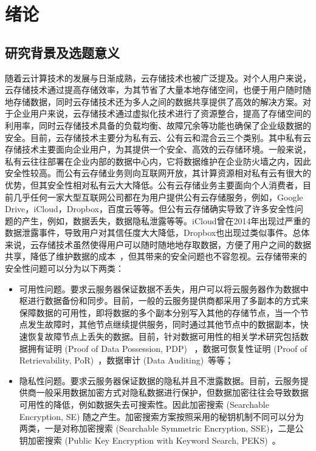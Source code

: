 \chapter{绪论}
\label{cha:intro}
\section{研究背景及选题意义}
随着云计算技术的发展与日渐成熟，云存储技术也被广泛提及。对个人用户来说，云存储技术通过提高存储效率，为其节省了大量本地存储空间，也便于用户随时随地存储数据，同时云存储技术还为多人之间的数据共享提供了高效的解决方案。对于企业用户来说，云存储技术通过虚拟化技术进行了资源整合，提高了存储空间的利用率，同时云存储技术具备的负载均衡、故障冗余等功能也确保了企业级数据的安全。目前，云存储技术主要分为私有云、公有云和混合云三个类别。其中私有云存储技术主要面向企业用户，为其提供一个安全、高效的云存储环境。一般来说，私有云往往部署在企业内部的数据中心内，它将数据维护在企业防火墙之内，因此安全性较高。而公有云存储业务则向互联网开放，其计算资源相对私有云有很大的优势，但其安全性相对私有云大大降低。公有云存储业务主要面向个人消费者，目前几乎任何一家大型互联网公司都在为用户提供公有云存储服务，例如，Google Drive，iCloud，Dropbox，百度云等等。但公有云存储确实导致了许多安全性问题的产生，例如，数据丢失，数据隐私泄露等等。iCloud曾在2014年出现过严重的数据泄露事件，导致用户对其信任度大大降低，Dropbox也出现过类似事件。总体来说，云存储技术虽然使得用户可以随时随地地存取数据，方便了用户之间的数据共享，降低了维护数据的成本~\cite{juels2007pors,ateniese2008scalable,kamara2011cs2,wang2011enabling,stefanov2012iris,kamara2013parallel,sun2015catch}，但其带来的安全问题也不容忽视。云存储带来的安全性问题可以分为以下两类：
\begin{itemize}
	\item 可用性问题。要求云服务器保证数据不丢失，用户可以将云服务器作为数据中枢进行数据备份和同步。目前，一般的云服务提供商都采用了多副本的方式来保障数据的可用性，即将数据的多个副本分别写入其他的存储节点，当一个节点发生故障时，其他节点继续提供服务，同时通过其他节点中的数据副本，快速恢复故障节点上丢失的数据。目前，针对数据可用性的相关学术研究包括数据拥有证明 (Proof of Data Possession, PDP)~\cite{ateniese2007provable, ateniese2008scalable,curtmola2008mr, erway2015dynamic,zhu2012cooperative} ，数据可恢复性证明 (Proof of Retrievability, PoR)~\cite{juels2007pors, bowers2009proofs, stefanov2012iris}，数据审计 (Data Auditing)~\cite{wang2010privacy,wang2010toward,wang2013privacy,wang2011enabling,zhu2011dynamic}等等；
	\item 隐私性问题。要求云服务器保证数据的隐私并且不泄露数据。目前，云服务提供商一般采用数据加密方式对隐私数据进行保护，但数据加密往往会导致数据可用性的降低，例如数据失去可搜索性。因此加密搜索 (Searchable Encryption, SE) 随之产生。加密搜索方案按照采用的秘钥机制不同可以分为两类，一是对称加密搜索 (Searchable Symmetric Encryption, SSE)\cite{song2000practical,curtmola2011searchable,kamara2012dynamic,cash2014dynamic,wang2016searchable}，二是公钥加密搜索 (Public Key Encryption with Keyword Search, PEKS)~\cite{boneh2004public}。
\end{itemize}

